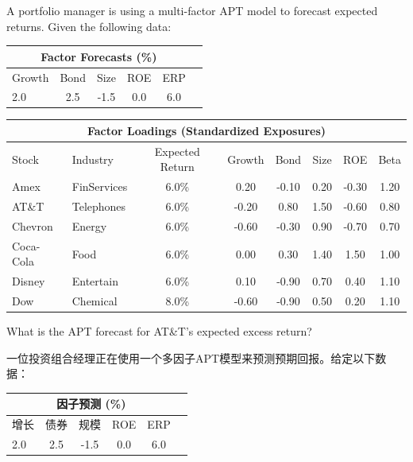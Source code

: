 \documentclass{article}
\newcounter{question} %
\begin{document}
\begin{question}
    A portfolio manager is using a multi-factor APT model to forecast expected returns. Given the following data:
 

    \begin{center}
        \begin{tabular}{|l|c|c|c|c|c|}
            \hline
            \multicolumn{5}{|c|}{Factor Forecasts (\%)} \\
            \hline
            Growth & Bond & Size & ROE & ERP \\ \hline
            2.0 & 2.5 & -1.5 & 0.0 & 6.0 \\ \hline
        \end{tabular}
    \end{center}

    \begin{center}
        \begin{tabular}{|l|l|c|c|c|c|c|c|}
            \hline
            \multicolumn{8}{|c|}{Factor Loadings (Standardized Exposures)} \\
            \hline
            Stock & Industry & Expected Return & Growth & Bond & Size & ROE & Beta \\
            \hline
            Amex & FinServices & 6.0\% & 0.20 & -0.10 & 0.20 & -0.30 & 1.20 \\
            AT\&T & Telephones & 6.0\% & -0.20 & 0.80 & 1.50 & -0.60 & 0.80 \\
            Chevron & Energy & 6.0\% & -0.60 & -0.30 & 0.90 & -0.70 & 0.70 \\
            Coca-Cola & Food & 6.0\% & 0.00 & 0.30 & 1.40 & 1.50 & 1.00 \\
            Disney & Entertain & 6.0\% & 0.10 & -0.90 & 0.70 & 0.40 & 1.10 \\
            Dow & Chemical & 8.0\% & -0.60 & -0.90 & 0.50 & 0.20 & 1.10 \\
            \hline
        \end{tabular}
    \end{center}

    What is the APT forecast for AT\&T's expected excess return?
  
    一位投资组合经理正在使用一个多因子APT模型来预测预期回报。给定以下数据：
    \begin{center}
        \begin{tabular}{|l|c|c|c|c|c|}
            \hline
            \multicolumn{5}{|c|}{因子预测 (\%)} \\
            \hline
            增长 & 债券 & 规模 & ROE & ERP \\ \hline
            2.0 & 2.5 & -1.5 & 0.0 & 6.0 \\ \hline
        \end{tabular}
    \end{center}


\end{question}
\end{document}
